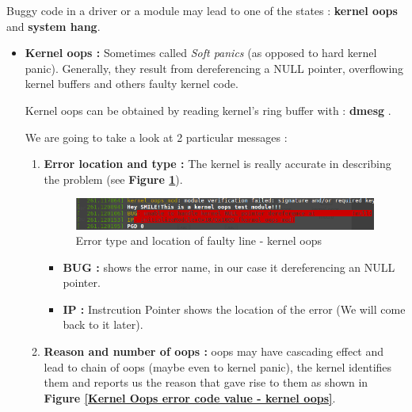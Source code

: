 Buggy code in a driver or a module may lead to one of the states : \textbf{kernel oops} and \textbf{system hang}.\\
\vspace{8px}

\begin{itemize}
	\item \textbf{Kernel oops : } Sometimes called \emph{Soft panics} (as opposed to hard kernel panic). Generally, they result from dereferencing a NULL pointer, overflowing kernel buffers and others faulty kernel code.\\
\vspace{5px}	


\begin{center}
\begin{mdframed}[
        linecolor=red,linewidth=2pt,%
        frametitlerule=true,%
        apptotikzsetting={\tikzset{mdfframetitlebackground/.append style={%
            shade,left color=white, right color=blue!20}}}, 
        frametitlerulecolor=blue,
        frametitlerulewidth=1pt, innertopmargin=\topskip,
        frametitle={Reading Kernel Oop},
        outerlinewidth=1.25pt
    ]
Kernel oops can be obtained by reading kernel's ring buffer with : \og \textbf{dmesg} \fg.
\end{mdframed}
\end{center}
	
\vspace{6px}	
We are going to take a look at 2 particular messages : 	

	\begin{enumerate}
		\item \textbf{Error location and type : } The kernel is really accurate in describing the problem (see \textbf{Figure \ref{Error type and location of faulty line - kernel oops}}).
		
\begin{figure}[H]
		\centering
        \includegraphics[scale=0.5]{img/solution/oops-error-kernel.png}
        \caption{Error type and location of faulty line - kernel oops}
        \label{Error type and location of faulty line - kernel oops}
    \end{figure}		
		
		
			\begin{itemize}
				\item \textbf{BUG : } shows the error name, in our case it \og dereferencing an NULL pointer\fg.				
				\item \textbf{IP : } Instrcution Pointer shows the location of the error (We will come back to it later).
			\end{itemize}					
		\item \textbf{Reason and number of oops : } oops may have cascading effect and lead to chain of oops (maybe even to kernel panic), the kernel identifies them and reports us the reason that gave rise to them as shown in \textbf{Figure \ref{Kernel Oops error code value - kernel oops}}.


\end{enumerate}
\end{itemize}
